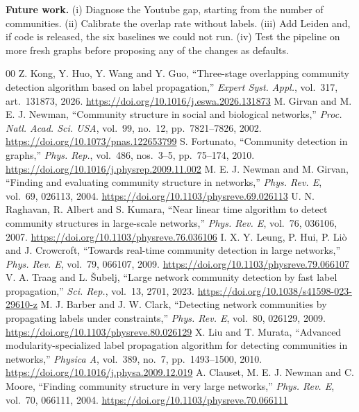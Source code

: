 \documentclass[conference]{IEEEtran}
\begin{document}
\textbf{Future work.} (i) Diagnose the Youtube gap, starting from the number of communities. (ii) Calibrate the overlap rate without labels. (iii) Add Leiden and, if code is released, the six baselines we could not run. (iv) Test the pipeline on more fresh graphs before proposing any of the changes as defaults.

\begin{thebibliography}{00}
 Z. Kong, Y. Huo, Y. Wang and Y. Guo, ``Three-stage overlapping community detection algorithm based on label propagation,'' \emph{Expert Syst. Appl.}, vol.~317, art.~131873, 2026. \url{https://doi.org/10.1016/j.eswa.2026.131873}
 M. Girvan and M. E. J. Newman, ``Community structure in social and biological networks,'' \emph{Proc. Natl. Acad. Sci. USA}, vol.~99, no.~12, pp.~7821--7826, 2002. \url{https://doi.org/10.1073/pnas.122653799}
 S. Fortunato, ``Community detection in graphs,'' \emph{Phys. Rep.}, vol.~486, nos.~3--5, pp.~75--174, 2010. \url{https://doi.org/10.1016/j.physrep.2009.11.002}
 M. E. J. Newman and M. Girvan, ``Finding and evaluating community structure in networks,'' \emph{Phys. Rev. E}, vol.~69, 026113, 2004. \url{https://doi.org/10.1103/physreve.69.026113}
 U. N. Raghavan, R. Albert and S. Kumara, ``Near linear time algorithm to detect community structures in large-scale networks,'' \emph{Phys. Rev. E}, vol.~76, 036106, 2007. \url{https://doi.org/10.1103/physreve.76.036106}
 I. X. Y. Leung, P. Hui, P. Li\`o and J. Crowcroft, ``Towards real-time community detection in large networks,'' \emph{Phys. Rev. E}, vol.~79, 066107, 2009. \url{https://doi.org/10.1103/physreve.79.066107}
 V. A. Traag and L. \v{S}ubelj, ``Large network community detection by fast label propagation,'' \emph{Sci. Rep.}, vol.~13, 2701, 2023. \url{https://doi.org/10.1038/s41598-023-29610-z}
 M. J. Barber and J. W. Clark, ``Detecting network communities by propagating labels under constraints,'' \emph{Phys. Rev. E}, vol.~80, 026129, 2009. \url{https://doi.org/10.1103/physreve.80.026129}
 X. Liu and T. Murata, ``Advanced modularity-specialized label propagation algorithm for detecting communities in networks,'' \emph{Physica A}, vol.~389, no.~7, pp.~1493--1500, 2010. \url{https://doi.org/10.1016/j.physa.2009.12.019}
 A. Clauset, M. E. J. Newman and C. Moore, ``Finding community structure in very large networks,'' \emph{Phys. Rev. E}, vol.~70, 066111, 2004. \url{https://doi.org/10.1103/physreve.70.066111}

\end{thebibliography}
\end{document}
